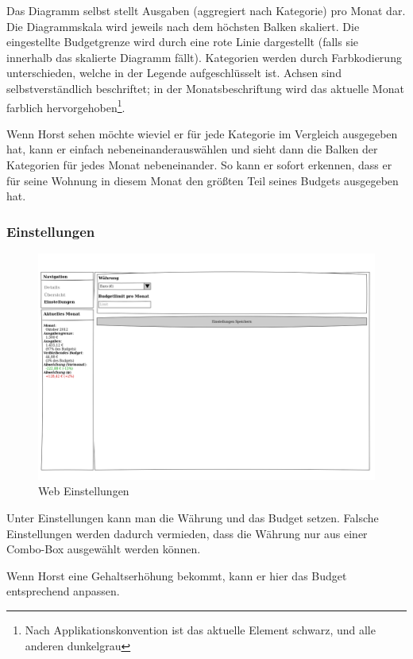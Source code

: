 Das Diagramm selbst stellt Ausgaben (aggregiert nach Kategorie) pro Monat dar.
Die Diagrammskala wird jeweils nach dem höchsten Balken skaliert.  Die
eingestellte Budgetgrenze wird durch eine rote Linie dargestellt (falls sie
innerhalb das skalierte Diagramm fällt). Kategorien werden durch Farbkodierung
unterschieden, welche in der Legende aufgeschlüsselt ist. Achsen sind
selbstverständlich beschriftet; in der Monatsbeschriftung wird das aktuelle
Monat farblich hervorgehoben\footnote{Nach Applikationskonvention ist das
aktuelle Element schwarz, und alle anderen dunkelgrau}.

Wenn Horst sehen m\"ochte wieviel er f\"ur jede Kategorie im Vergleich
ausgegeben hat, kann er einfach \glqq nebeneinander\grqq\space ausw\"ahlen und sieht
dann die Balken der Kategorien f\"ur jedes Monat nebeneinander. So kann er
sofort erkennen, dass er f\"ur seine Wohnung in diesem Monat den gr\"o\ss ten
Teil seines Budgets ausgegeben hat.

\newpage
\subsubsection{Einstellungen}

\begin{figure}[htl]
\centering
\includegraphics[width=\textwidth]{img/web_settings}
\caption{Web Einstellungen}
\label{fig:web_settings}
\end{figure}

Unter Einstellungen kann man die W\"ahrung und das Budget setzen. Falsche
Einstellungen werden dadurch vermieden, dass die W\"ahrung nur aus einer
Combo-Box ausgew\"ahlt werden k\"onnen.

Wenn Horst eine Gehaltserh\"ohung bekommt, kann er hier das Budget entsprechend
anpassen.

